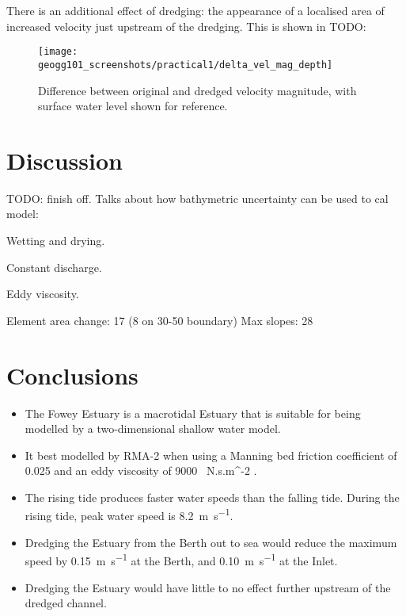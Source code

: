 \documentclass{article}
\begin{document}
There is an additional effect of dredging: the appearance of a localised area of increased velocity just upstream of the dredging. This is shown in TODO: %

\begin{figure}[!h]
    \centering
    \texttt{[image: geogg101\_screenshots/practical1/delta\_vel\_mag\_depth]}
    \caption{Difference between original and dredged velocity magnitude, with surface water level shown for reference.}
    \label{fig:delta_vel_mag_depth}
\end{figure}

\section{Discussion}

TODO: finish off. Talks about how bathymetric uncertainty can be used to cal model: \textcite{cea2012bathymetric}

Wetting and drying.

Constant discharge.

Eddy viscosity.

Element area change: 17 (8 on 30-50 boundary)
Max slopes: 28

\section{Conclusions}


\begin{itemize}
    \item The Fowey Estuary is a macrotidal Estuary that is suitable for being modelled by a two-dimensional shallow water model.
    \item It best modelled by RMA-2 when using a Manning bed friction coefficient of 0.025 and an eddy viscosity of \SI{9000}{ N.s.m^{-2} }.
    \item The rising tide produces faster water speeds than the falling tide. During the rising tide, peak water speed is \SI{8.2}{m.s^{-1}}.
    \item Dredging the Estuary from the Berth out to sea would reduce the maximum speed by \SI{0.15}{m.s^{-1}} at the Berth, and \SI{0.10}{m.s^{-1}} at the Inlet.
    \item Dredging the Estuary would have little to no effect further upstream of the dredged channel.
\end{itemize}
\end{document}
